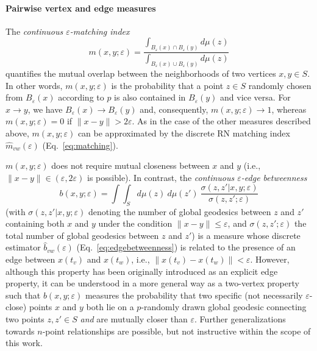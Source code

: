 \paragraph{Pairwise vertex and edge measures}

The \emph{continuous $\varepsilon$-matching index}
\begin{equation}
m(x,y;\varepsilon)=\frac{\int_{B_{\varepsilon}(x)\cap B_{\varepsilon}(y)}d\mu(z)}{\int_{B_{\varepsilon}(x)\cup B_{\varepsilon}(y)}d\mu(z)}
\end{equation}
\noindent
quantifies the mutual overlap between the neighborhoods of two vertices $x,y\in S$. In other words, $m(x,y;\varepsilon)$ is the probability that a point $z\in S$ randomly chosen from $B_{\varepsilon}(x)$ according to $p$ is also contained in $B_{\varepsilon}(y)$ and vice versa. For $x\to y$, we have $B_{\varepsilon}(x)\to B_{\varepsilon}(y)$ and, consequently, $m(x,y;\varepsilon)\to 1$, whereas $m(x,y;\varepsilon)=0$ if $\|x-y\|>2\varepsilon$. As in the case of the other measures described above, $m(x,y;\varepsilon)$ can be approximated by the discrete RN matching index $\hat{m}_{vw}(\varepsilon)$ (Eq.~\ref{eq:matching}).

$m(x,y;\varepsilon)$ does not require mutual closeness between $x$ and $y$ (i.e., $\|x-y\|\in(\varepsilon,2\varepsilon)$ is possible). In contrast, the \emph{continuous $\varepsilon$-edge betweenness}
\begin{equation}
b(x,y;\varepsilon)=\int\int_S d\mu(z)\ d\mu(z')\ \frac{\sigma(z,z'|x,y;\varepsilon)}{\sigma(z,z';\varepsilon)}
\end{equation}
\noindent
(with $\sigma(z,z'|x,y;\varepsilon)$ denoting the number of global geodesics between $z$ and $z'$ containing both $x$ and $y$ under the condition $\|x-y\|\leq\varepsilon$, and $\sigma(z,z';\varepsilon)$ the total number of global geodesics between $z$ and $z'$) is a measure whose discrete estimator $\hat{b}_{vw}(\varepsilon)$ (Eq.~\ref{eq:edgebetweenness}) is related to the presence of an edge between $x(t_v)$ and $x(t_w)$, i.e., $\|x(t_v)-x(t_w)\|< \varepsilon$. However, although this property has been originally introduced as an explicit edge property, it can be understood in a more general way as a two-vertex property such that $b(x,y;\varepsilon)$ measures the probability that two specific (not necessarily $\varepsilon$-close) points $x$ and $y$ both lie on a $p$-randomly drawn global geodesic connecting two points $z,z'\in S$ \emph{and} are mutually closer than $\varepsilon$. Further generalizations towards $n$-point relationships are possible, but not instructive within the scope of this work.


